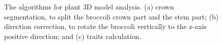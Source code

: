 \begin{figure}[htbp!]
  \begin{center}
  \end{center}
  \caption[The algorithms for plant 3D model analysis]{
    The algorithms for plant 3D model analysis. (a) crown segmentation, to split the broccoli crown part and the stem part; (b) direction correction, to rotate the broccoli vertically to the z-axis positive direction; and (c) traits calculation.
  }
  \label{fig:des_seg_alg}
\end{figure}